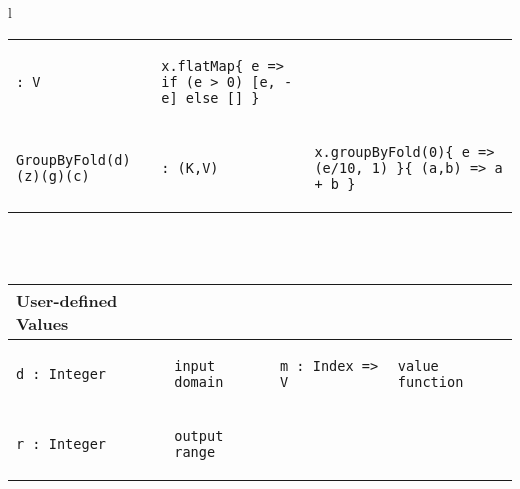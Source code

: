 \documentclass[pageno]{jpaper}
\begin{document}
\begin{figure*}
\begin{tabular}{l}
{\begin{tabular*}{0.95\textwidth}{ll|l}
{\begin{lstlisting}[numbers=none,mathescape=true]
: V
\end{lstlisting}} &

{\begin{lstlisting}[numbers=none,mathescape=true]
x.flatMap{ e => if (e > 0) [e, -e] else [] }
\end{lstlisting}} \\

{\begin{lstlisting}[numbers=none,mathescape=true]
GroupByFold(d)(z)(g)(c)
\end{lstlisting}} &

{\begin{lstlisting}[numbers=none,mathescape=true]
: (K,V)
\end{lstlisting}} &

{\begin{lstlisting}[numbers=none,mathescape=true]
x.groupByFold(0){ e => (e/10, 1) }{ (a,b) => a + b }
\end{lstlisting}} \\ \hline

\end{tabular*}}
\\
\\
{\begin{tabular*}{0.95\textwidth}{llll}
{\bf User-defined Values} & & & \\ \hline
{\begin{lstlisting}[numbers=none,mathescape=true]
d : Integer
\end{lstlisting}} &

{\begin{lstlisting}[numbers=none,mathescape=true]
input domain
\end{lstlisting}} &

{\begin{lstlisting}[numbers=none,mathescape=true]
m : Index => V
\end{lstlisting}} &

{\begin{lstlisting}[numbers=none,mathescape=true]
value function
\end{lstlisting}} \\

{\begin{lstlisting}[numbers=none,mathescape=true]
r : Integer
\end{lstlisting}} &

{\begin{lstlisting}[numbers=none,mathescape=true]
output range
\end{lstlisting}} &


\end{tabular*}}
\end{tabular}
\end{figure*}
\end{document}
